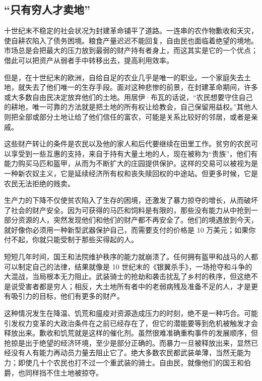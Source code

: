 \subsection{“只有穷人才卖地”}
十世纪末不稳定的社会状况为封建革命铺平了道路。一连串的农作物歉收和天灾，使自耕农陷入了债务困境。粮食产量迟迟不能回复，自由民也面临着绝望的境地。市场总是会把最大的压力放到最弱的财产持有者身上，而这其实是它的一个优点；借此可以把资产从弱者手中转移出去，提高利用效率。

但是，在十世纪末的欧洲，自给自足的农业几乎是唯一的职业。一个家庭失去土地，就失去了他们唯一的生存手段。面对这种悲惨的前景，在封建革命期间，许多或大多数自由民决定放弃他们的土地。用居伊·布瓦的话说，“农民想要守住自己的耕地，唯一可靠的方法就是把土地的所有权让给教会，自己保留用益权。”其他人则把全部或部分土地让给了他们信任的富农，可能是关系比较好的邻居，或者是亲戚。


这些财产转让的条件是农民以及他的家人和后代要继续在田里工作。贫穷的农民可以享受到一些互惠的支持，来自于持有大量土地的人，现在被称为“贵族”，他们有能力购买马匹和盔甲，从而为不断扩大的庄园提供保护。这样的交易可以被视为是一种新农奴主义，它是延续经济所有权和丧失赎回权的中途站。但更多时候，它是农民无法拒绝的贱卖。

生产力的下降不仅使贫农陷入了生存的困境，还激发了暴力掠夺的增长，从而破坏了社会的财产安全。因为可获得的马匹和饲料是有限的，那些没有能力从中抢到一部分资源的人，突然发现他们和他们的财产都不再安全了。他们的境遇放到今天，就好像你必须用一种新型武器保护自己，而需要支付的价格是 10 万美元；如果你付不起，你就只能受制于那些买得起的人。

短短几年时间，国王和法院维护秩序的能力就崩溃了。任何拥有盔甲和战马的人都可以制定自己的法律，结果就像是 10 世纪末的《银翼杀手》，一场抢夺和斗争的大混战，当局根本无力阻止。武装骑士的抢劫和袭击扰乱了乡村的秩序，但这绝不是说受害者都是穷人；相反，大土地所有者中的老弱病残及准备不足的人，才是更有吸引力的目标，他们有更多的财产。

这种情况发生在降温、饥荒和瘟疫对资源造成压力的时刻，绝不是一种巧合。可能引发权力变革的大政治条件在之前已经存在了，但它的潜能要等到危机被触发才会释放出来。歉收和饥荒就是这样的催化剂。虽然很难准确重构事件的发展顺序，但抢掠是出于绝望的经济环境，至少是部分正确的。而暴力一旦被释放出来，显然已经没有人有能力再动员力量去阻止它了。绝大多数农民都武装单薄，当然无能为力；即使几十个农民也打不过一个重武装的骑士。自由民，就像他们的国王和伯爵，也同样挡不住土地被掠夺。

